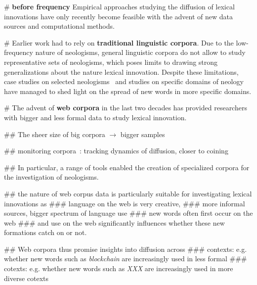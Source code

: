 \documentclass[
  a4paper,
  abstract=on,
  captions=tableabove
  ]{scrartcl}
\renewcommand{\hw}[1]{\textbf{#1}}
\begin{document}
  \begin{easylist}[itemize]

    # \hw{before frequency} Empirical approaches studying the diffusion of lexical innovations have only recently become feasible with the advent of new data sources and computational methods.

    # Earlier work had to rely on \hw{traditional linguistic corpora}. Due to the low-frequency nature of neologisms, general linguistic corpora do not allow to study representative sets of neologisms, which poses limits to drawing strong generalizations about the nature lexical innovation. Despite these limitations, case studies on selected neologisms~\parencite{Hohenhaus2006BouncebackabilityWebascorpusbased} and studies on specific domains of neology~\parencite{Elsen2004Neologismen} have managed to shed light on the spread of new words in more specific domains.

    # The advent of \hw{web corpora} in the last two decades has provided researchers with bigger and less formal data to study lexical innovation.

    ## The sheer size of big corpora $\rightarrow$ bigger samples

    ## monitoring corpora~\parencite{Davies2013CorpusNews}: tracking dynamics of diffusion, closer to coining

    ## In particular, a range of tools enabled the creation of specialized corpora for the investigation of neologisms.~\parencite{Renouf2006WebCorpIntegrated, Kerremans2012NeoCrawlerIdentifying,LemnitzerWortwarte,Gerard2017LogoscopeSemiautomatic,Cartier2017NeoveilleWeb}

    ## the nature of web corpus data is particularly suitable for investigating lexical innovations as
      ### language on the web is very creative,
      ### more informal sources, bigger spectrum of language use
      ### new words often first occur on the web
      ### and use on the web significantly influences whether these new formations catch on or not.

    ## Web corpora thus promise insights into diffusion across
      ### contexts: e.g. whether new words such as \emph{blockchain} are increasingly used in less formal
      ### cotexts: e.g. whether new words such as \emph{XXX} are increasingly used in more diverse cotexts



  \end{easylist}
\end{document}
